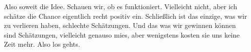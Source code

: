 Also soweit die Idee. Schauen wir, ob es funktioniert. Vielleicht nicht, aber ich schätze die Chance eigentlich recht positiv ein. Schließlich ist das einzige, was wir zu verlieren haben, schlechte Schätzungen. Und das was wir gewinnen können sind Schätzungen, vielleicht genauso mies, aber wenigstens kosten sie uns keine Zeit mehr. Also los gehts.

